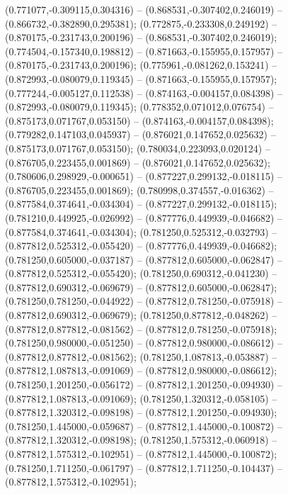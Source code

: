 (0.771077,-0.309115,0.304316) -- (0.868531,-0.307402,0.246019) -- (0.866732,-0.382890,0.295381);
 (0.772875,-0.233308,0.249192) -- (0.870175,-0.231743,0.200196) -- (0.868531,-0.307402,0.246019);
 (0.774504,-0.157340,0.198812) -- (0.871663,-0.155955,0.157957) -- (0.870175,-0.231743,0.200196);
 (0.775961,-0.081262,0.153241) -- (0.872993,-0.080079,0.119345) -- (0.871663,-0.155955,0.157957);
 (0.777244,-0.005127,0.112538) -- (0.874163,-0.004157,0.084398) -- (0.872993,-0.080079,0.119345);
 (0.778352,0.071012,0.076754) -- (0.875173,0.071767,0.053150) -- (0.874163,-0.004157,0.084398);
 (0.779282,0.147103,0.045937) -- (0.876021,0.147652,0.025632) -- (0.875173,0.071767,0.053150);
 (0.780034,0.223093,0.020124) -- (0.876705,0.223455,0.001869) -- (0.876021,0.147652,0.025632);
 (0.780606,0.298929,-0.000651) -- (0.877227,0.299132,-0.018115) -- (0.876705,0.223455,0.001869);
 (0.780998,0.374557,-0.016362) -- (0.877584,0.374641,-0.034304) -- (0.877227,0.299132,-0.018115);
 (0.781210,0.449925,-0.026992) -- (0.877776,0.449939,-0.046682) -- (0.877584,0.374641,-0.034304);
 (0.781250,0.525312,-0.032793) -- (0.877812,0.525312,-0.055420) -- (0.877776,0.449939,-0.046682);
 (0.781250,0.605000,-0.037187) -- (0.877812,0.605000,-0.062847) -- (0.877812,0.525312,-0.055420);
 (0.781250,0.690312,-0.041230) -- (0.877812,0.690312,-0.069679) -- (0.877812,0.605000,-0.062847);
 (0.781250,0.781250,-0.044922) -- (0.877812,0.781250,-0.075918) -- (0.877812,0.690312,-0.069679);
 (0.781250,0.877812,-0.048262) -- (0.877812,0.877812,-0.081562) -- (0.877812,0.781250,-0.075918);
 (0.781250,0.980000,-0.051250) -- (0.877812,0.980000,-0.086612) -- (0.877812,0.877812,-0.081562);
 (0.781250,1.087813,-0.053887) -- (0.877812,1.087813,-0.091069) -- (0.877812,0.980000,-0.086612);
 (0.781250,1.201250,-0.056172) -- (0.877812,1.201250,-0.094930) -- (0.877812,1.087813,-0.091069);
 (0.781250,1.320312,-0.058105) -- (0.877812,1.320312,-0.098198) -- (0.877812,1.201250,-0.094930);
 (0.781250,1.445000,-0.059687) -- (0.877812,1.445000,-0.100872) -- (0.877812,1.320312,-0.098198);
 (0.781250,1.575312,-0.060918) -- (0.877812,1.575312,-0.102951) -- (0.877812,1.445000,-0.100872);
 (0.781250,1.711250,-0.061797) -- (0.877812,1.711250,-0.104437) -- (0.877812,1.575312,-0.102951);

